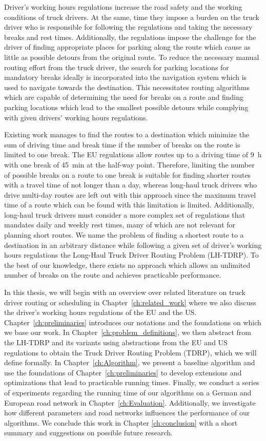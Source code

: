 Driver's working hours regulations increase the road safety and the working conditions of truck drivers. At the same, time they impose a burden on the truck driver who is responsible for following the regulations and taking the necessary breaks and rest times. Additionally, the regulations impose the challenge for the driver of finding appropriate places for parking along the route which cause as little as possible detours from the original route. To reduce the necessary manual routing effort from the truck driver, the search for parking locations for mandatory breaks ideally is incorporated into the navigation system which is used to navigate towards the destination. This necessitates routing algorithms which are capable of determining the need for breaks on a route and finding parking locations which lead to the smallest possible detours while complying with given drivers' working hours regulations.

Existing work manages to find the routes to a destination which minimize the sum of driving time and break time if the number of breaks on the route is limited to one break. The EU regulations allow routes up to a driving time of \SI{9}{\hour} with one break of \SI{45}{\minute} at the half-way point. Therefore, limiting the number of possible breaks on a route to one break is suitable for finding shorter routes with a travel time of not longer than a day, whereas long-haul truck drivers who drive multi-day routes are left out with this approach since the maximum travel time of a route which can be found with this limitation is limited. Additionally, long-haul truck drivers must consider a more complex set of regulations that mandates daily and weekly rest times, many of which are not relevant for planning short routes. We name the problem of finding a shortest route to a destination in an arbitrary distance while following a given set of driver's working hours regulations the Long-Haul Truck Driver Routing Problem (LH-TDRP). To the best of our knowledge, there exists no approach which allows an unlimited number of breaks on the route and achieves practicable performance.

In this thesis, we will begin with an overview over related literature on truck driver routing or scheduling in Chapter~\ref{ch:related_work} where we also discuss the driver's working hours regulations of the EU and the US. Chapter~\ref{ch:preliminaries} introduces our notations and the foundations on which we base our work. In Chapter~\ref{ch:problem_definitions}, we then abstract from the LH-TDRP and its variants using abstractions from the EU and US regulations to obtain the Truck Driver Routing Problem (TDRP), which we will define formally. In Chapter~\ref{ch:Algorithm}, we present a baseline algorithm and use the foundations of Chapter~\ref{ch:preliminaries} to develop extensions and optimizations that lead to practicable running times. Finally, we conduct a series of experiments regarding the running time of our algorithms on a German and European road network in Chapter~\ref{ch:Evaluation}. Additionally, we investigate how different parameters and road networks influences the performance of our algorithms. We conclude this work in Chapter \ref{ch:conclusion} with a short summary and suggestions on possible future research.